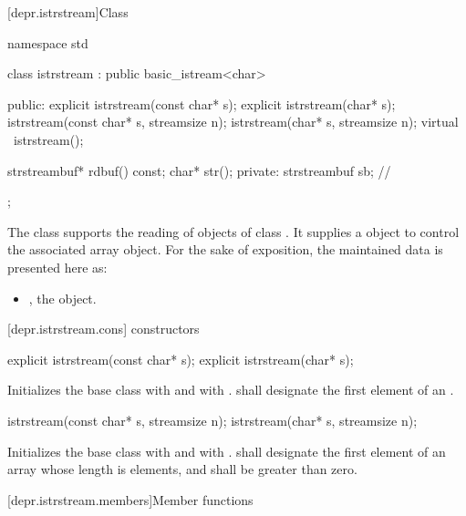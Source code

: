 [depr.istrstream]{Class }

%
\begin{codeblock}
namespace std {
  class istrstream : public basic_istream<char> {
  public:
    explicit istrstream(const char* s);
    explicit istrstream(char* s);
    istrstream(const char* s, streamsize n);
    istrstream(char* s, streamsize n);
    virtual ~istrstream();

    strstreambuf* rdbuf() const;
    char* str();
  private:
    strstreambuf sb;            // \expos
  };
}
\end{codeblock}

\pnum
The class
supports the reading of objects of class
.
It supplies a
object to control the associated array object.
For the sake of exposition, the maintained data is presented here as:

\begin{itemize}
\item
{}, the  object.
\end{itemize}

[depr.istrstream.cons]{ constructors}

%
\begin{itemdecl}
explicit istrstream(const char* s);
explicit istrstream(char* s);
\end{itemdecl}

\begin{itemdescr}
\pnum
\effects
Initializes the base class with  and
 with .
 shall designate the first element of an \ntbs{}.%
\end{itemdescr}

%
\begin{itemdecl}
istrstream(const char* s, streamsize n);
istrstream(char* s, streamsize n);
\end{itemdecl}

\begin{itemdescr}
\pnum
\effects
Initializes the base class with 
and  with .
 shall designate the first element of an array whose length is
 elements, and  shall be greater than zero.
\end{itemdescr}

[depr.istrstream.members]{Member functions}

